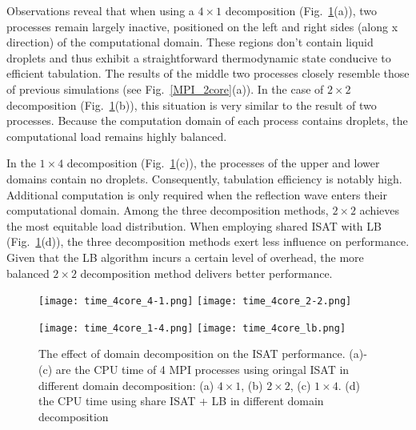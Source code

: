 Observations reveal that when using a $4\times1$ decomposition (Fig.~\ref{MPI_4core}(a)), two processes remain largely inactive, positioned on the left and right sides (along x direction) of the computational domain. These regions don't contain liquid droplets and thus exhibit a straightforward thermodynamic state conducive to efficient tabulation. The results of the middle two processes closely resemble those of previous simulations (see Fig.~\ref{MPI_2core}(a)). In the case of $2\times2$ decomposition  (Fig.~\ref{MPI_4core}(b)), this situation is very similar to the result of two processes. Because the computation domain of each process contains droplets, the computational load remains highly balanced.

In the $1\times4$ decomposition (Fig.~\ref{MPI_4core}(c)), the processes of the upper and lower domains contain no droplets. Consequently, tabulation efficiency is notably high. Additional computation is only required when the reflection wave enters their computational domain. Among the three decomposition methods, $2\times2$ achieves the most equitable load distribution. When employing shared ISAT with LB  (Fig.~\ref{MPI_4core}(d)), the three decomposition methods exert less influence on performance. Given that the LB algorithm incurs a certain level of overhead, the more balanced $2\times2$ decomposition method delivers better performance.

\begin{figure}[htbp]
	\centering
	\texttt{[image: time\_4core\_4-1.png]}
	\texttt{[image: time\_4core\_2-2.png]}

	\texttt{[image: time\_4core\_1-4.png]}
	\texttt{[image: time\_4core\_lb.png]}
	\caption{The effect of domain decomposition on the ISAT performance. (a)-(c) are the CPU time of 4 MPI processes using oringal ISAT in different domain decomposition: (a) $4\times1$, (b) $2\times2$, (c) $1\times4$. (d) the CPU time using share ISAT + LB in different domain decomposition}\label{MPI_4core}
\end{figure}



